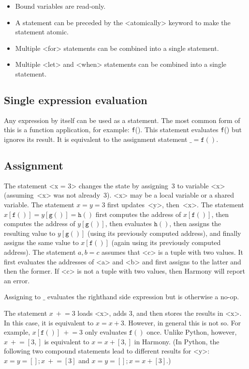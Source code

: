 \documentclass{report}
\begin{document}
\begin{itemize}
\item Bound variables are read-only.
\item A statement can be preceded by the <{atomically}> keyword to make
the statement atomic.
\item Multiple <{for}> statements can be combined into a single statement.
\item Multiple <{let}> and <{when}> statements can be combined into
a single statement.
\end{itemize}

\subsection*{Single expression evaluation}

Any expression by itself can be used as a statement.  The most common
form of this is a function application, for example: \texttt{f}().
This statement evaluates \texttt{f}() but ignores its result.
It is equivalent to the assignment statement $\_ = \mathtt{f}()$.

\subsection*{Assignment}

The statement <{x = 3}> changes the state by assigning~3 to
variable <{x}> (assuming~<{x}> was not already~3).
<{x}> may be a local variable or a shared variable.
The statement $x = y = 3$ first updates~<{y}>, then~<{x}>.
The statement $x[\mathtt{f}()] = y[\mathtt{g}()] = \mathtt{h}()$ first computes
the address of $x[\mathtt{f}()]$, then computes the address of
$y[\mathtt{g}()]$, then evaluates $\mathtt{h}()$, then assigns the resulting value to $y[\mathtt{g}()]$ (using its previously computed address), and finally assigns the same value to $x[\mathtt{f}()]$ (again using its previously computed address).
The statement $a,b = c$ assumes that <{c}> is a tuple with two values.
It first evaluates the addresses of <{a}> and <{b}> and first assigns to
the latter and then the former.
If <{c}> is not a tuple with two values, then Harmony will report an error.

Assigning to $\_$ evaluates the righthand side expression but is otherwise
a no-op.

The statement $x~+$$= 3$ loads <{x}>, adds 3, and then stores the
results in <{x}>.  In this case, it is equivalent to $x = x + 3$.
However, in general this is not so.  For example, $x[\mathtt{f}()]~+$$= 3$
only evaluates $\mathtt{f}()$ once.  Unlike Python, however,
$x~+$$= [3,]$ is equivalent to $x = x + [3,]$ in Harmony.
(In Python, the following two compound statements lead to different results
for <{y}>: $x = y = []; x~+$$= [3]$ and $x = y = []; x = x + [3]$.)
\end{document}
